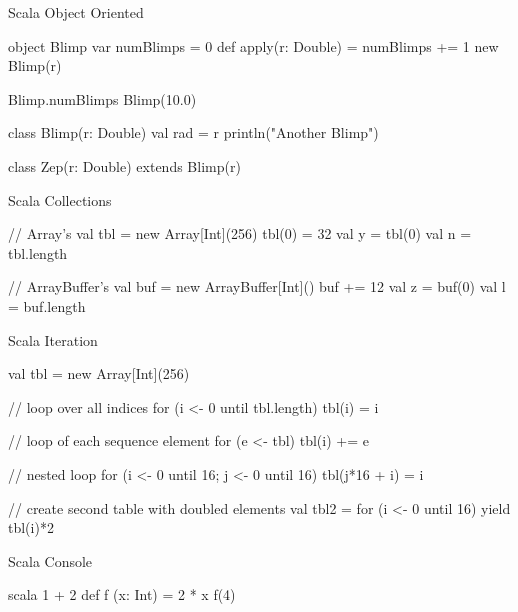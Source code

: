 \documentclass[xcolor=pdflatex,dvipsnames,table]{beamer}
\begin{document}
\begin{frame}[fragile]{Scala Object Oriented}

\begin{scala}
object Blimp {
  var numBlimps = 0
  def apply(r: Double) = {
    numBlimps += 1
    new Blimp(r)
  }
}

Blimp.numBlimps
Blimp(10.0)

class Blimp(r: Double) {
  val rad = r
  println("Another Blimp")
}

class Zep(r: Double) extends Blimp(r)
\end{scala}

\end{frame}

\begin{frame}[fragile]{Scala Collections}
\begin{scala}
// Array's
val tbl = new Array[Int](256)
tbl(0) = 32
val y = tbl(0)
val n = tbl.length

// ArrayBuffer's
val buf = new ArrayBuffer[Int]()
buf += 12
val z = buf(0)
val l = buf.length
\end{scala}
\end{frame}

\begin{frame}[fragile]{Scala Iteration}
\begin{scala}
val tbl = new Array[Int](256)

// loop over all indices
for (i <- 0 until tbl.length)
  tbl(i) = i

// loop of each sequence element
for (e <- tbl)
  tbl(i) += e

// nested loop
for (i <- 0 until 16; j <- 0 until 16)
  tbl(j*16 + i) = i

// create second table with doubled elements
val tbl2 = for (i <- 0 until 16) yield tbl(i)*2
\end{scala}
\end{frame}

\begin{frame}[fragile]{Scala Console}
\begin{scala}
scala
1 + 2
def f (x: Int) = 2 * x
f(4)
\end{scala}
\end{frame}
\end{document}
